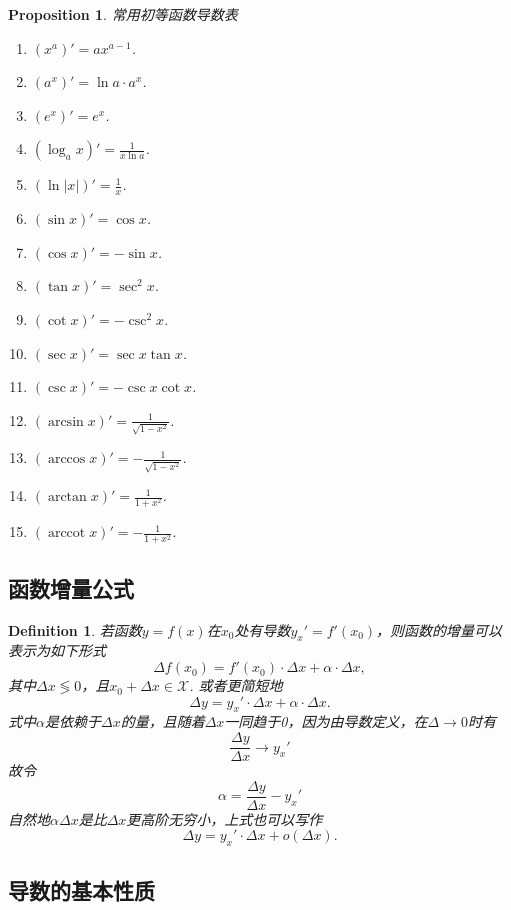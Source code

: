 \documentclass{article}
\newtheorem{proposition}[theorem]{Proposition}
\newtheorem{definition}[theorem]{Definition}
\DeclareMathOperator{\arccot}{arccot}
\begin{document}
\begin{proposition} \rm 常用初等函数导数表 
\begin{enumerate} 
	\item $(x^a)' = ax^{a-1}$.
	\item $(a^x)' = \ln a\cdot a^x $.
	\item $(e^x)' = e^x$.
	\item $(\log_a x)' = \frac{1}{x\ln a}$.
	\item $(\ln |x|)' = \frac{1}{x}$.
	\item $(\sin x)' = \cos x$.
	\item $(\cos x)' = -\sin x$.
	\item $(\tan x)' = \sec^2 x$.
	\item $(\cot x)' = -\csc^2 x$.
	\item $(\sec x)' = \sec x \tan x$.
	\item $(\csc x)' = -\csc x \cot x$.
	\item $(\arcsin x)' = \frac{1}{\sqrt{1-x^2}}$.
	\item $(\arccos x)' = -\frac{1}{\sqrt{1-x^2}}$.
	\item $(\arctan x)' = \frac{1}{1+x^2}$.
	\item $(\arccot x)' = -\frac{1}{1+x^2}$.
\end{enumerate}
\end{proposition}

\newpage
\subsection{函数增量公式}

\begin{definition}
\rm 若函数$y=f(x)$在$x_0$处有导数$y_x'=f'(x_0)$，则函数的增量可以表示为如下形式
$$
\Delta f(x_0) = f'(x_0) \cdot \Delta x + \alpha \cdot \Delta x,
$$
其中$\Delta x \lessgtr 0$，且$x_0 + \Delta x \in \mathcal{X}$. 或者更简短地
$$
\Delta y = y_x'\cdot \Delta x + \alpha \cdot \Delta x.
$$
式中$\alpha$是依赖于$\Delta x$的量，且随着$\Delta x$一同趋于0，因为由导数定义，在$\Delta \rightarrow 0$时有
$$
\frac{\Delta y}{\Delta x} \rightarrow y_x'
$$
故令
$$
\alpha =  \frac{\Delta y}{\Delta x} - y_x'
$$
自然地$\alpha \Delta x$是比$\Delta x$更高阶无穷小，上式也可以写作
$$
\Delta y = y_x' \cdot \Delta x + o(\Delta x).
$$
\end{definition}

\subsection{导数的基本性质}
\end{document}
